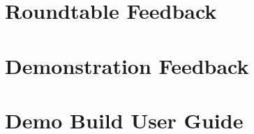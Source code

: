 \documentclass{l3proj}
\begin{document}
\chapter{Roundtable Feedback}
\label{app:roundtableFeedback}


\chapter{Demonstration Feedback}
\label{app:demonstrationFeedback}


\chapter{Demo Build User Guide}
\label{app:userGuideDemo}
%


\clearpage


\end{document}
